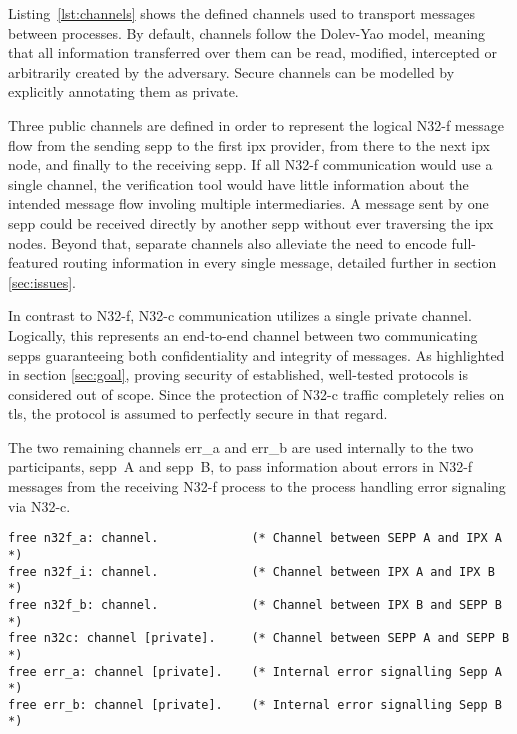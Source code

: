 Listing~\ref{lst:channels} shows the defined channels used to transport messages between processes.
By default, channels follow the Dolev-Yao model, meaning that all information transferred over them can be read, modified, intercepted or arbitrarily created by the adversary.
Secure channels can be modelled by explicitly annotating them as private.

Three public channels are defined in order to represent the logical N32-f message flow from the sending \gls{sepp} to the first \gls{ipx} provider, from there to the next \gls{ipx} node, and finally to the receiving \gls{sepp}.
If all N32-f communication would use a single channel, the verification tool would have little information about the intended message flow involing multiple intermediaries.
A message sent by one \gls{sepp} could be received directly by another \gls{sepp} without ever traversing the \gls{ipx} nodes.
Beyond that, separate channels also alleviate the need to encode full-featured routing information in every single message, detailed further in section \ref{sec:issues}.

In contrast to N32-f, N32-c communication utilizes a single private channel.
Logically, this represents an end-to-end channel between two communicating \glspl{sepp} guaranteeing both confidentiality and integrity of messages.
As highlighted in section \ref{sec:goal}, proving security of established, well-tested protocols is considered out of scope.
Since the protection of N32-c traffic completely relies on \gls{tls}, the protocol is assumed to perfectly secure in that regard.

The two remaining channels {\sffamily err\_a} and {\sffamily err\_b} are used internally to the two participants, \gls{sepp}~A and \gls{sepp}~B, to pass information about errors in N32-f messages from the receiving N32-f process to the process handling error signaling via N32-c.

\begin{lstlisting}[caption={Custom channel declarations},label={lst:channels},firstnumber=15]
free n32f_a: channel.             (* Channel between SEPP A and IPX A *)
free n32f_i: channel.             (* Channel between IPX A and IPX B *)
free n32f_b: channel.             (* Channel between IPX B and SEPP B *)
free n32c: channel [private].     (* Channel between SEPP A and SEPP B *)
free err_a: channel [private].    (* Internal error signalling Sepp A *)
free err_b: channel [private].    (* Internal error signalling Sepp B *)
\end{lstlisting}

